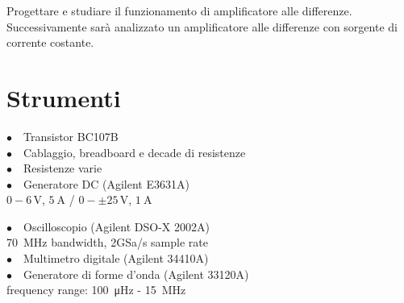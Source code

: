 Progettare e studiare il funzionamento di amplificatore alle differenze. Successivamente sarà analizzato un amplificatore alle differenze con sorgente di corrente costante. 

\section{Strumenti}
%
\noindent
\begin{minipage}{.5\linewidth}
$\bullet \quad$Transistor BC107B\\
$\bullet \quad$Cablaggio, breadboard e decade di resistenze\\
$\bullet \quad$Resistenze varie\\
$\bullet \quad$Generatore DC (Agilent E3631A)\\
\phantom{xxxx}$0-6\,\si{\volt}$, $\SI{5}{\ampere}$ / $0-\pm25\,\si{\volt}$, $\SI{1}{\ampere}$\\
\end{minipage}%
\begin{minipage}{.5\linewidth}
$\bullet \quad$Oscilloscopio (Agilent DSO-X 2002A)\\
\phantom{xxxx}\SI{70}{\mega\hertz} bandwidth, 2GSa/s sample rate\\
$\bullet \quad$Multimetro digitale (Agilent 34410A)\\
$\bullet \quad$Generatore di forme d'onda (Agilent 33120A)\\
\phantom{xxxx}frequency range: \SI{100}{\micro\hertz} - \SI{15}{\mega\hertz}\\
\end{minipage}